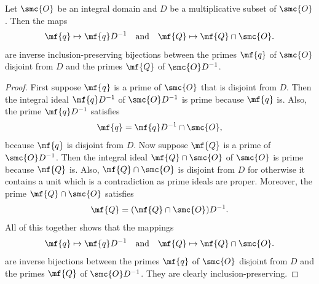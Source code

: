 \documentclass[12pt]{article}
\begin{document}
      \begin{proposition}\label{prop:localization_prime_bijection}
        Let \(\smc{O}\) be an integral domain and \(D\) be a multiplicative subset of \(\smc{O}\). Then the maps
        \[
          \mf{q} \mapsto \mf{q}D^{-1} \quad \text{and} \quad \mf{Q} \mapsto \mf{Q} \cap \smc{O}.
        \]
        are inverse inclusion-preserving bijections between the primes \(\mf{q}\) of \(\smc{O}\) disjoint from \(D\) and the primes \(\mf{Q}\) of \(\smc{O}D^{-1}\).
      \end{proposition}
      \begin{proof}
        First suppose \(\mf{q}\) is a prime of \(\smc{O}\) that is disjoint from \(D\). Then the integral ideal \(\mf{q}D^{-1}\) of \(\smc{O}D^{-1}\) is prime because \(\mf{q}\) is. Also, the prime \(\mf{q}D^{-1}\) satisfies
        \[
          \mf{q} = \mf{q}D^{-1} \cap \smc{O},
        \]
        because \(\mf{q}\) is disjoint from \(D\). Now suppose \(\mf{Q}\) is a prime of \(\smc{O}D^{-1}\). Then the integral ideal \(\mf{Q} \cap \smc{O}\) of \(\smc{O}\) is prime because \(\mf{Q}\) is. Also, \(\mf{Q} \cap \smc{O}\) is disjoint from \(D\) for otherwise it contains a unit which is a contradiction as prime ideals are proper. Moreover, the prime \(\mf{Q} \cap \smc{O}\) satisfies
        \[
          \mf{Q} = (\mf{Q} \cap \smc{O})D^{-1}.
        \]
        All of this together shows that the mappings
        \[
          \mf{q} \mapsto \mf{q}D^{-1} \quad \text{and} \quad \mf{Q} \mapsto \mf{Q} \cap \smc{O}.
        \]
        are inverse bijections between the primes \(\mf{q}\) of \(\smc{O}\) disjoint from \(D\) and the primes \(\mf{Q}\) of \(\smc{O}D^{-1}\). They are clearly inclusion-preserving.
      \end{proof}
\end{document}
